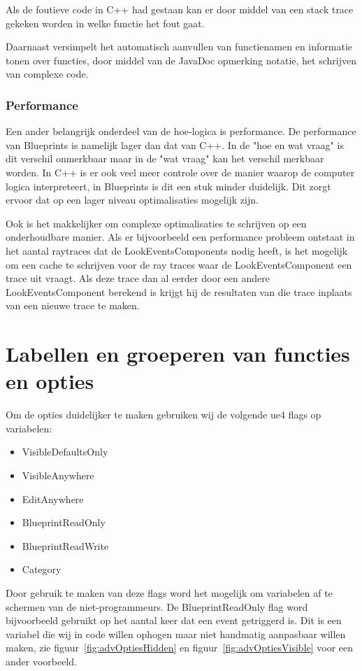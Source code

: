 Als de foutieve code in C++ had gestaan kan er door middel van een stack trace gekeken worden in welke functie het fout gaat.

Daarnaast versimpelt het automatisch aanvullen van functienamen en informatie tonen over functies, door middel van de JavaDoc opmerking notatie, het schrijven van complexe code.

\subsubsection{Performance}
Een ander belangrijk onderdeel van de hoe-logica is performance. De performance van Blueprints is namelijk lager dan dat van C++. In de "hoe en wat vraag" is dit verschil onmerkbaar maar in de "wat vraag" kan het verschil merkbaar worden.
In C++ is er ook veel meer controle over de manier waarop de computer logica interpreteert, in Blueprints is dit een stuk minder duidelijk. Dit zorgt ervoor dat op een lager niveau optimalisaties mogelijk zijn. 

Ook is het makkelijker om complexe optimalisaties te schrijven op een onderhoudbare manier. Als er bijvoorbeeld een performance probleem ontstaat in het aantal raytraces dat de LookEventsComponents nodig heeft, is het mogelijk om een cache te schrijven voor de ray traces waar de LookEventsComponent een trace uit vraagt. Als deze trace dan al eerder door een andere LookEventsComponent berekend is krijgt hij de resultaten van die trace inplaats van een nieuwe trace te maken.

\section{Labellen en groeperen van functies en opties}
\label{sec:metadata}
Om de opties duidelijker te maken gebruiken wij de volgende \gls{ue4} flags op variabelen:

\begin{itemize}
	\item VisibleDefaultsOnly
	\item VisibleAnywhere
	\item EditAnywhere
	\item BlueprintReadOnly
	\item BlueprintReadWrite
	\item Category
\end{itemize}

Door gebruik te maken van deze flags word het mogelijk om variabelen af te schermen van de niet-programmeurs. De BlueprintReadOnly flag word bijvoorbeeld gebruikt op het aantal keer dat een event getriggerd is. Dit is een variabel die wij in code willen ophogen maar niet handmatig aanpasbaar willen maken, zie figuur~\ref{fig:advOptiesHidden} en figuur~\ref{fig:advOptiesVisible} voor een ander voorbeeld.

